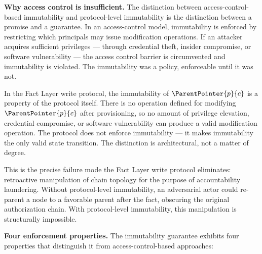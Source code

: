 \medskip
\noindent\textbf{Why access control is insufficient.} The distinction between access-control-based immutability and protocol-level immutability is the distinction between a promise and a guarantee. In an access-control model, immutability is enforced by restricting which principals may issue modification operations. If an attacker acquires sufficient privileges --- through credential theft, insider compromise, or software vulnerability --- the access control barrier is circumvented and immutability is violated. The immutability was a policy, enforceable until it was not.

In the Fact Layer write protocol, the immutability of $\ParentPointer{p}{c}$ is a property of the protocol itself. There is no operation defined for modifying $\ParentPointer{p}{c}$ after provisioning, so no amount of privilege elevation, credential compromise, or software vulnerability can produce a valid modification operation. The protocol does not enforce immutability --- it makes immutability the only valid state transition. The distinction is architectural, not a matter of degree.

This is the precise failure mode the Fact Layer write protocol eliminates: retroactive manipulation of chain topology for the purpose of accountability laundering. Without protocol-level immutability, an adversarial actor could re-parent a node to a favorable parent after the fact, obscuring the original authorization chain. With protocol-level immutability, this manipulation is structurally impossible.

\medskip
\noindent\textbf{Four enforcement properties.} The immutability guarantee exhibits four properties that distinguish it from access-control-based approaches:

